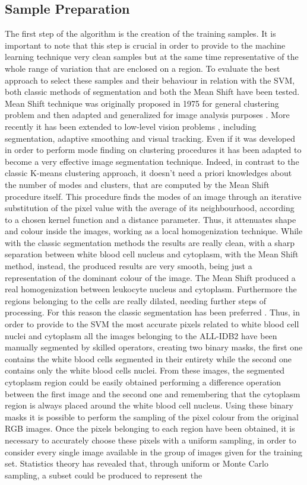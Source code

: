 \documentclass[final,a4paper,12pt,english]{UnicaPhdThesis3}
\begin{document}
	\subsection{Sample Preparation}
	The first step of the algorithm is the creation of the training samples. It is important to note that this step is crucial in order to provide to the machine learning technique very clean samples but at the same time representative of the whole range of variation that are enclosed on a region. To evaluate the best approach to select these samples and their behaviour in relation with the SVM, both classic methods of segmentation and both the Mean Shift have been tested. Mean Shift technique was originally proposed in 1975 for general clustering problem\cite{fukunaga} and then adapted and generalized for image analysis purposes \cite{pan}. More recently it has been extended to low-level vision problems \cite{Foran}, including segmentation, adaptive smoothing and visual tracking. Even if it was developed in order to perform mode finding on clustering procedures it has been adapted to become a very effective image segmentation technique. Indeed, in contrast to the classic K-means clustering approach, it doesn't need a priori knowledges about the number of modes and clusters, that are computed by the Mean Shift procedure itself. This procedure finds the modes of an image through an iterative substitution of the pixel value with the average of its neighbourhood, according to a chosen kernel function and a distance parameter. Thus, it attenuates shape and colour inside the images, working as a local homogenization technique. While with the classic segmentation methods the results are really clean, with a sharp separation between white blood cell nucleus and cytoplasm, with the Mean Shift method, instead, the produced results are very smooth, being just a representation of the dominant colour of the image. The Mean Shift produced a real homogenization between leukocyte nucleus and cytoplasm. Furthermore the regions belonging to the cells are really dilated, needing further steps of processing. For this reason the classic segmentation has been preferred \cite{Put15c, Put15d}. Thus, in order to provide to the SVM the most accurate pixels related to white blood cell nuclei and cytoplasm all the images belonging to the ALL-IDB2 have been manually segmented by skilled operators, creating two binary masks, the first one contains the white blood cells segmented in their entirety while the second one contains only the white blood cells nuclei. From these images, the segmented cytoplasm region could be easily obtained performing a difference operation between the first image and the second one and remembering that the cytoplasm region is always placed around the white blood cell nucleus. Using these binary masks it is possible to perform the sampling of the pixel colour from the original RGB images. Once the pixels belonging to each region have been obtained, it is necessary to accurately choose these pixels with a uniform sampling, in order to consider every single image available in the group of images given for the training set. Statistics theory has revealed that, through uniform or Monte Carlo sampling, a subset could be produced to represent the 
\end{document}
